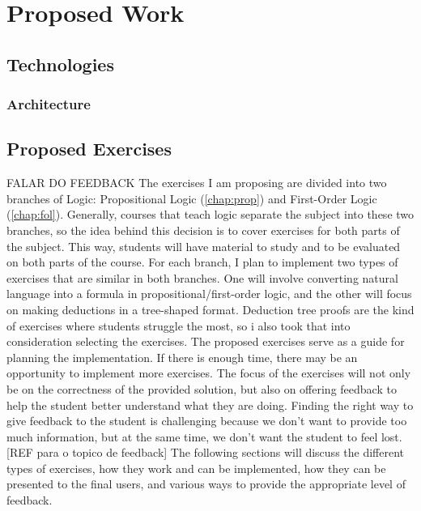 
%

\chapter{Proposed Work}

\section{Technologies}
\subsection{Architecture}

\section{Proposed Exercises} FALAR DO FEEDBACK
The exercises I am proposing are divided into two branches of Logic: Propositional Logic (\ref{chap:prop}) and First-Order Logic (\ref{chap:fol}). Generally, courses that teach logic separate the subject into these two branches, so the idea behind this decision is to cover exercises for both parts of the subject. This way, students will have material to study and to be evaluated on both parts of the course. For each branch, I plan to implement two types of exercises that are similar in both branches. One will involve converting natural language into a formula in propositional/first-order logic, and the other will focus on making deductions in a tree-shaped format. Deduction tree proofs are the kind of exercises where students struggle the most, so i also took that into consideration selecting the exercises. The proposed exercises serve as a guide for planning the implementation. If there is enough time, there may be an opportunity to implement more exercises. The focus of the exercises will not only be on the correctness of the provided solution, but also on offering feedback to help the student better understand what they are doing. Finding the right way to give feedback to the student is challenging because we don’t want to provide too much information, but at the same time, we don’t want the student to feel lost. [REF para o topico de feedback]
The following sections will discuss the different types of exercises, how they work and can be implemented, how they can be presented to the final users, and various ways to provide the appropriate level of feedback.

